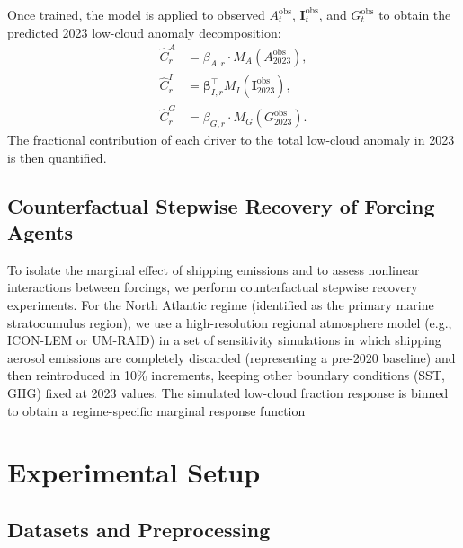\documentclass{article}
\begin{document}
Once trained, the model is applied to observed $A_t^{\text{obs}}$, $\mathbf{I}_t^{\text{obs}}$, and $G_t^{\text{obs}}$ to obtain the predicted 2023 low-cloud anomaly decomposition:
\begin{align}
\hat{C}_r^{A} &= \beta_{A,r} \cdot M_{A}(A_{2023}^{\text{obs}}), \\
\hat{C}_r^{I} &= \boldsymbol{\beta}_{I,r}^{\top} M_{I}(\mathbf{I}_{2023}^{\text{obs}}), \\
\hat{C}_r^{G} &= \beta_{G,r} \cdot M_{G}(G_{2023}^{\text{obs}}).
\end{align}
The fractional contribution of each driver to the total low-cloud anomaly in 2023 is then quantified.

\subsection{Counterfactual Stepwise Recovery of Forcing Agents}
\label{sec:recovery}
To isolate the marginal effect of shipping emissions and to assess nonlinear interactions between forcings, we perform counterfactual stepwise recovery experiments. For the North Atlantic regime (identified as the primary marine stratocumulus region), we use a high-resolution regional atmosphere model (e.g., ICON-LEM or UM-RAID) in a set of sensitivity simulations in which shipping aerosol emissions are completely discarded (representing a pre-2020 baseline) and then reintroduced in 10\% increments, keeping other boundary conditions (SST, GHG) fixed at 2023 values. The simulated low-cloud fraction response is binned to obtain a regime-specific marginal response function

\section{Experimental Setup}

\subsection{Datasets and Preprocessing}
\end{document}

